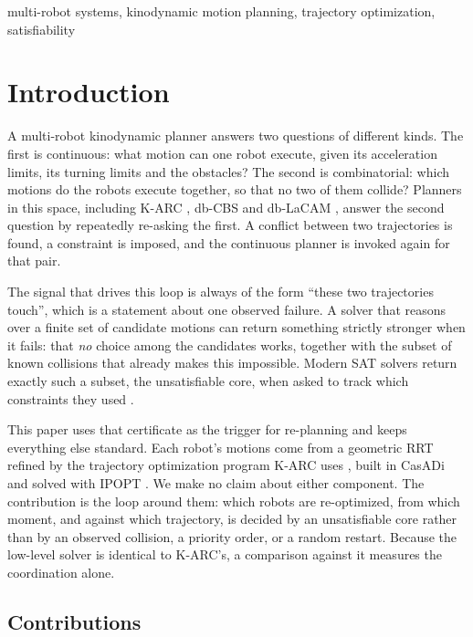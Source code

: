 \documentclass[conference]{IEEEtran}
\theoremstyle{plain}
\theoremstyle{definition}
\begin{document}
\begin{IEEEkeywords}
multi-robot systems, kinodynamic motion planning, trajectory optimization, satisfiability
\end{IEEEkeywords}

\section{Introduction}

A multi-robot kinodynamic planner answers two questions of different kinds. The first is
continuous: what motion can one robot execute, given its acceleration limits, its turning
limits and the obstacles? The second is combinatorial: which motions do the robots execute
together, so that no two of them collide? Planners in this space, including K-ARC
\cite{karc2025}, db-CBS \cite{dbcbs2024} and db-LaCAM \cite{dblacam2025}, answer the second
question by repeatedly re-asking the first. A conflict between two trajectories is found,
a constraint is imposed, and the continuous planner is invoked again for that pair.

The signal that drives this loop is always of the form ``these two trajectories touch'',
which is a statement about one observed failure. A solver that reasons over a finite set of
candidate motions can return something strictly stronger when it fails: that \emph{no}
choice among the candidates works, together with the subset of known collisions that already
makes this impossible. Modern SAT solvers return exactly such a subset, the unsatisfiable
core, when asked to track which constraints they used \cite{z3}.

This paper uses that certificate as the trigger for re-planning and keeps everything else
standard. Each robot's motions come from a geometric RRT \cite{lavalle2001} refined by the
trajectory optimization program K-ARC uses \cite{karc2025}, built in CasADi
\cite{casadi2019} and solved with IPOPT \cite{ipopt2006}. We make no claim about either
component. The contribution is the loop around them: which robots are re-optimized, from
which moment, and against which trajectory, is decided by an unsatisfiable core rather than
by an observed collision, a priority order, or a random restart. Because the low-level solver
is identical to K-ARC's, a comparison against it measures the coordination alone.

\subsection*{Contributions}
\end{document}

